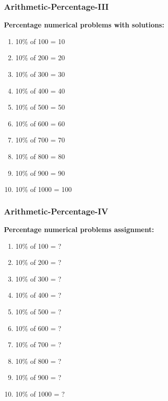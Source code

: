 \documentclass{beamer}
\begin{document}
\begin{frame}
    \frametitle{Arithmetic-Percentage-III}
    {\bf Percentage numerical problems with solutions:} 
    \begin{enumerate}
        \item 10\% of 100 = 10
        \item 10\% of 200 = 20
        \item 10\% of 300 = 30
        \item 10\% of 400 = 40
        \item 10\% of 500 = 50
        \item 10\% of 600 = 60
        \item 10\% of 700 = 70
        \item 10\% of 800 = 80
        \item 10\% of 900 = 90
        \item 10\% of 1000 = 100
    \end{enumerate}
\end{frame}

\begin{frame}
    \frametitle{Arithmetic-Percentage-IV}
    {\bf Percentage numerical problems assignment:} 
    \begin{enumerate}
        \item 10\% of 100 = ?
        \item 10\% of 200 = ?
        \item 10\% of 300 = ?
        \item 10\% of 400 = ?
        \item 10\% of 500 = ?
        \item 10\% of 600 = ?
        \item 10\% of 700 = ?
        \item 10\% of 800 = ?
        \item 10\% of 900 = ?
        \item 10\% of 1000 = ?
    \end{enumerate}
\end{frame}

\end{document}
